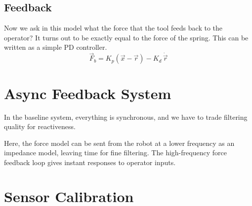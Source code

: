 \documentclass[11pt]{article}
\begin{document}
\subsection{Feedback}

Now we ask in this model what the force that the tool feeds back to the operator? It turns out to be exactly equal to the force of the spring. This can be written as a simple PD controller.
\begin{equation*}
\vec{F}_b = K_p(\vec{x}-\vec{r}) - K_d \,\dot{\vec{r}}
\end{equation*}

\section{Async Feedback System}

In the baseline system, everything is synchronous, and we have to trade filtering quality for reactiveness.

Here, the force model can be sent from the robot at a lower frequency as an impedance model, leaving time for fine filtering. The high-frequency force feedback loop gives instant responses to operator inputs.

\begin{center}
\end{center}

\section{Sensor Calibration}
\end{document}
